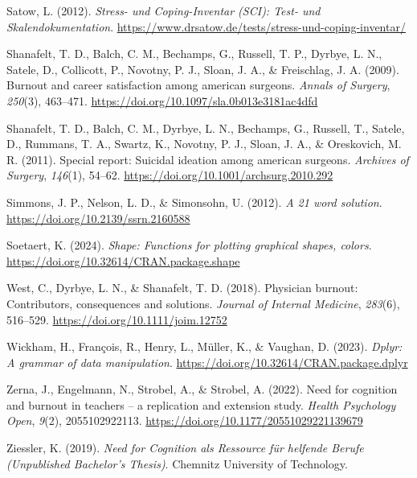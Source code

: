 \documentclass[
  man]{apa6}
\newlength{\cslhangindent}
\newenvironment{CSLReferences}[2] %
 {\begin{list}{}{%
  \setlength{\itemindent}{0pt}
  \setlength{\leftmargin}{0pt}
  \setlength{\parsep}{0pt}
  \ifodd #1
   \setlength{\leftmargin}{\cslhangindent}
   \setlength{\itemindent}{-1\cslhangindent}
  \fi
  \setlength{\itemsep}{#2\baselineskip}}}
 {\end{list}}
\begin{document}
\begin{CSLReferences}{1}{0}
Satow, L. (2012). \emph{{Stress- und Coping-Inventar (SCI): Test- und Skalendokumentation}}. \url{https://www.drsatow.de/tests/stress-und-coping-inventar/}

Shanafelt, T. D., Balch, C. M., Bechamps, G., Russell, T. P., Dyrbye, L. N., Satele, D., Collicott, P., Novotny, P. J., Sloan, J. A., \& Freischlag, J. A. (2009). Burnout and career satisfaction among american surgeons. \emph{Annals of Surgery}, \emph{250}(3), 463--471. \url{https://doi.org/10.1097/sla.0b013e3181ac4dfd}

Shanafelt, T. D., Balch, C. M., Dyrbye, L. N., Bechamps, G., Russell, T., Satele, D., Rummans, T. A., Swartz, K., Novotny, P. J., Sloan, J. A., \& Oreskovich, M. R. (2011). Special report: Suicidal ideation among american surgeons. \emph{Archives of Surgery}, \emph{146}(1), 54--62. \url{https://doi.org/10.1001/archsurg.2010.292}

Simmons, J. P., Nelson, L. D., \& Simonsohn, U. (2012). \emph{A 21 word solution}. \url{https://doi.org/10.2139/ssrn.2160588}

Soetaert, K. (2024). \emph{Shape: Functions for plotting graphical shapes, colors}. \url{https://doi.org/10.32614/CRAN.package.shape}

West, C., Dyrbye, L. N., \& Shanafelt, T. D. (2018). Physician burnout: Contributors, consequences and solutions. \emph{Journal of Internal Medicine}, \emph{283}(6), 516--529. \url{https://doi.org/10.1111/joim.12752}

Wickham, H., François, R., Henry, L., Müller, K., \& Vaughan, D. (2023). \emph{Dplyr: A grammar of data manipulation}. \url{https://doi.org/10.32614/CRAN.package.dplyr}

Zerna, J., Engelmann, N., Strobel, A., \& Strobel, A. (2022). Need for cognition and burnout in teachers -- a replication and extension study. \emph{Health Psychology Open}, \emph{9}(2), 2055102922113. \url{https://doi.org/10.1177/20551029221139679}

Ziessler, K. (2019). \emph{{Need for Cognition als Ressource für helfende Berufe} ({Unpublished Bachelor's Thesis})}. Chemnitz University of Technology.

\end{CSLReferences}
\end{document}
